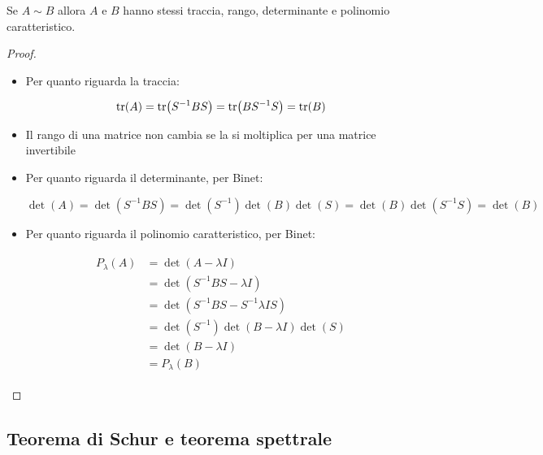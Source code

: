 \begin{definition}
	Se $ A \sim B $ allora $ A $ e $ B $ hanno stessi traccia, rango, determinante e polinomio caratteristico.
\end{definition}

\begin{proof}
	\begin{itemize}
		\item Per quanto riguarda la traccia:

		\begin{equation}
			\tr(A) = \tr(S^{-1} B S) = \tr(B S^{-1} S) = \tr(B)
		\end{equation}

		\item Il rango di una matrice non cambia se la si moltiplica per una matrice invertibile

		\item Per quanto riguarda il determinante, per Binet:

		\begin{equation}
			\det(A) = \det(S^{-1} B S) = \det(S^{-1}) \det(B) \det(S) = \det(B) \det(S^{-1} S) = \det(B)
		\end{equation}

		\item Per quanto riguarda il polinomio caratteristico, per Binet:
		
		\begin{align}
			\begin{split}
				P_{\lambda}(A) &= \det(A - \lambda I)\\
				&= \det(S^{-1} B S - \lambda I)\\
				&= \det(S^{-1} B S - S^{-1} \lambda I S)\\
				&= \det(S^{-1}) \det(B - \lambda I) \det(S)\\
				&= \det(B - \lambda I)\\
				&= P_{\lambda}(B)
			\end{split}
		\end{align}
		
	\end{itemize}
\end{proof}

\subsection{Teorema di Schur e teorema spettrale}

